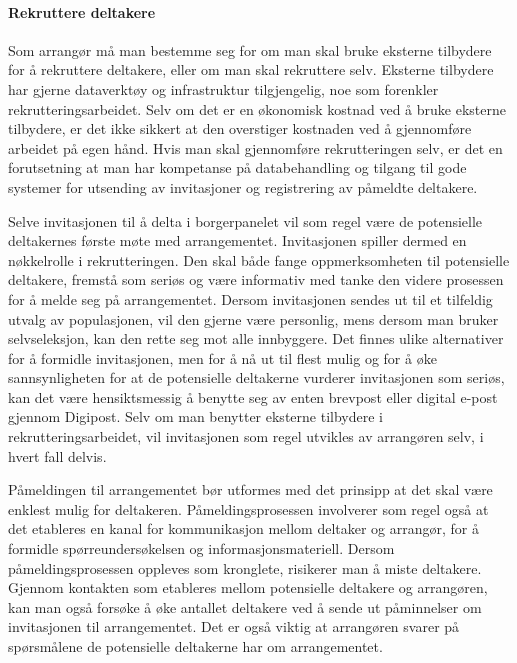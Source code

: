 \documentclass[
  12pt,
  a4paper, 12pt]{article}
\begin{document}
\hypertarget{rekruttere-deltakere}{%
\paragraph{Rekruttere deltakere}\label{rekruttere-deltakere}}

Som arrangør må man bestemme seg for om man skal bruke eksterne tilbydere for å rekruttere deltakere, eller om man skal rekruttere selv. Eksterne tilbydere har gjerne dataverktøy og infrastruktur tilgjengelig, noe som forenkler rekrutteringsarbeidet. Selv om det er en økonomisk kostnad ved å bruke eksterne tilbydere, er det ikke sikkert at den overstiger kostnaden ved å gjennomføre arbeidet på egen hånd. Hvis man skal gjennomføre rekrutteringen selv, er det en forutsetning at man har kompetanse på databehandling og tilgang til gode systemer for utsending av invitasjoner og registrering av påmeldte deltakere.

Selve invitasjonen til å delta i borgerpanelet vil som regel være de potensielle deltakernes første møte med arrangementet. Invitasjonen spiller dermed en nøkkelrolle i rekrutteringen. Den skal både fange oppmerksomheten til potensielle deltakere, fremstå som seriøs og være informativ med tanke den videre prosessen for å melde seg på arrangementet. Dersom invitasjonen sendes ut til et tilfeldig utvalg av populasjonen, vil den gjerne være personlig, mens dersom man bruker selvseleksjon, kan den rette seg mot alle innbyggere. Det finnes ulike alternativer for å formidle invitasjonen, men for å nå ut til flest mulig og for å øke sannsynligheten for at de potensielle deltakerne vurderer invitasjonen som seriøs, kan det være hensiktsmessig å benytte seg av enten brevpost eller digital e-post gjennom Digipost. Selv om man benytter eksterne tilbydere i rekrutteringsarbeidet, vil invitasjonen som regel utvikles av arrangøren selv, i hvert fall delvis.

Påmeldingen til arrangementet bør utformes med det prinsipp at det skal være enklest mulig for deltakeren. Påmeldingsprosessen involverer som regel også at det etableres en kanal for kommunikasjon mellom deltaker og arrangør, for å formidle spørreundersøkelsen og informasjonsmateriell. Dersom påmeldingsprosessen oppleves som kronglete, risikerer man å miste deltakere. Gjennom kontakten som etableres mellom potensielle deltakere og arrangøren, kan man også forsøke å øke antallet deltakere ved å sende ut påminnelser om invitasjonen til arrangementet. Det er også viktig at arrangøren svarer på spørsmålene de potensielle deltakerne har om arrangementet.
\end{document}
